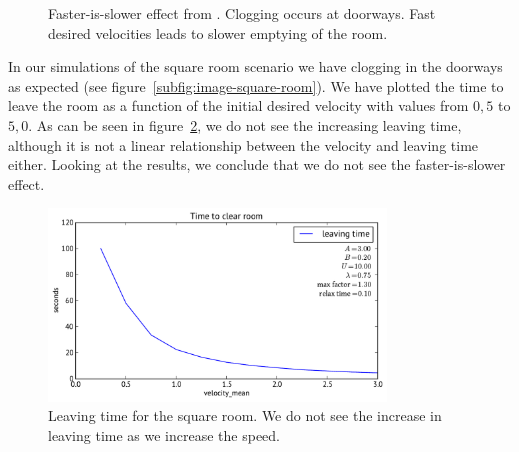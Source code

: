 \begin{figure}[ht]
    \centering
    \caption[Faster-is-slower effect from \cite{helbing00}]{Faster-is-slower 
    effect from \cite{helbing00}.  Clogging 
    occurs at doorways.  Fast desired 
    velocities leads to slower emptying of the room.}
    \label{fig:LtNFasterIsSlower}
\end{figure}

In our simulations of the square room scenario we have clogging in the 
doorways as expected (see figure~\ref{subfig:image-square-room}). We have 
plotted the time to leave the room as a function of the initial desired 
velocity with values from $0,5$ to $5,0$. As can be seen in 
figure~\ref{fig:square-room-leaving}, we do not see the increasing leaving 
time, although it is not a linear relationship between the velocity and 
leaving time either. Looking at the results, we conclude that we  do not see 
the faster-is-slower effect.

\begin{figure}[ht]
    \centering
    \includegraphics[width=0.8\textwidth]{Figures/timetoclearroom.pdf}
    \caption[Leaving time for the square room]{Leaving time for the square 
    room. We do not see the increase in leaving time as we increase the speed.}
    \label{fig:square-room-leaving}
\end{figure}

